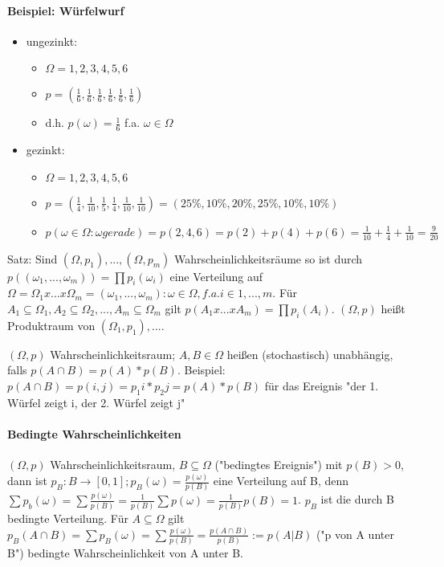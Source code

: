 \documentclass[10pt,landscape]{article}
\begin{document}
\begin{multicols}{3}
\paragraph{Beispiel: Würfelwurf} 
\begin{itemize}
    \item ungezinkt:
    \begin{itemize}
        \item $\Omega = {1,2,3,4,5,6}$
        \item $p=(\frac{1}{6},\frac{1}{6},\frac{1}{6},\frac{1}{6},\frac{1}{6},\frac{1}{6})$
        \item d.h. $p(\omega)=\frac{1}{6}$ f.a. $\omega \in \Omega$
    \end{itemize}
    \item gezinkt:
    \begin{itemize}
        \item $\Omega = {1,2,3,4,5,6}$
        \item $p=(\frac{1}{4}, \frac{1}{10}, \frac{1}{5}, \frac{1}{4}, \frac{1}{10}, \frac{1}{10})=(25\%, 10\%, 20\%, 25\%, 10\%, 10\%)$
        \item $p({\omega \in \Omega: \omega gerade})=p({2,4,6})=p(2)+p(4)+p(6)= \frac{1}{10}+ \frac{1}{4}+ \frac{1}{10} = \frac{9}{20}$
    \end{itemize}
\end{itemize}

Satz: Sind $(\Omega, p_1),...,(\Omega, p_m)$ Wahrscheinlichkeitsräume so ist durch $p((\omega_1,...,\omega_m))=\prod p_i(\omega_i)$ eine Verteilung auf $\Omega = \Omega_1 x ... x \Omega_m = {(\omega_1,...,\omega_m): \omega \in \Omega, f.a. i\in{1,...,m}}$. Für $A_1\subseteq \Omega_1, A_2\subseteq \Omega_2,...,A_m\subseteq \Omega_m$ gilt $p(A_1x...xA_m)=\prod p_i(A_i)$.
$(\Omega, p)$ heißt Produktraum von $(\Omega_1, p_1),...$.

$(\Omega, p)$ Wahrscheinlichkeitsraum; $A,B\in \Omega$ heißen (stochastisch) unabhängig, falls $p(A\cap B) = p(A)*p(B)$.
Beispiel: $p(A\cap B) = p({i,j}) =p_1{i}*p_2{j} = p(A)*p(B)$ für das Ereignis "der 1. Würfel zeigt i, der 2. Würfel zeigt j"

\paragraph{Bedingte Wahrscheinlichkeiten}
$(\Omega, p)$ Wahrscheinlichkeitsraum, $B\subseteq \Omega$ ("bedingtes Ereignis") mit $p(B)>0$, dann ist $p_B:B\rightarrow [0,1]; p_B(\omega)=\frac{p(\omega)}{p(B)}$ eine Verteilung auf B, denn $\sum p_b(\omega)=\sum \frac{p(\omega)}{p(B)}=\frac{1}{p(B)} \sum p(\omega)= \frac{1}{p(B)} p(B)= 1$.
$p_B$ ist die durch B bedingte Verteilung. Für $A\subseteq \Omega$ gilt $p_B(A\cap B)=\sum p_B(\omega)=\sum\frac{p(\omega)}{p(B)}= \frac{p(A\cap B)}{p(B)}:= p(A|B)$ ("p von A unter B") bedingte Wahrscheinlichkeit von A unter B.


\end{multicols}
\end{document}
